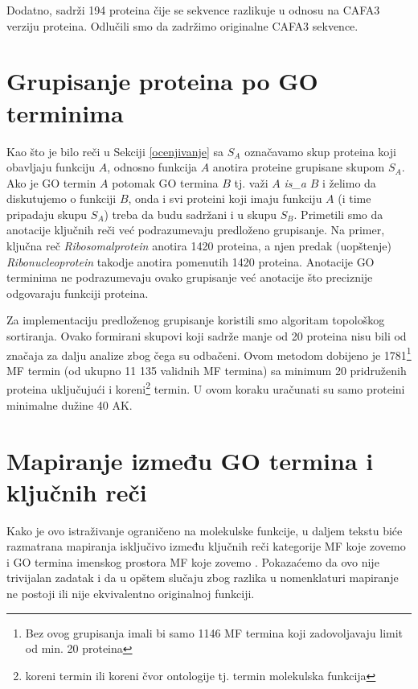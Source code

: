Dodatno, \swissprot sadrži 194 proteina čije se sekvence razlikuje u
odnosu na CAFA3 verziju proteina. Odlučili smo da zadržimo originalne CAFA3
sekvence.

\section{Grupisanje proteina po GO terminima}
\label{grupisanje}

Kao što je bilo reči u Sekciji \ref{ocenjivanje} sa $S_A$ označavamo skup
proteina koji obavljaju funkciju $A$, odnosno funkcija $A$ anotira proteine
grupisane skupom $S_A$.
Ako je GO termin $A$ potomak GO termina $B$ tj. važi $A$ \textit{is\_a} $B$ i
želimo da diskutujemo o funkciji $B$, onda i svi proteini koji imaju funkciju
$A$ (i time pripadaju skupu $S_A$) treba da budu sadržani i u skupu $S_B$.
Primetili smo da anotacije ključnih reči već podrazumevaju predloženo grupisanje.
Na primer, ključna reč \textit{Ribosomalprotein} anotira 1420 proteina, a
njen predak (uopštenje) \textit{Ribonucleoprotein} takodje anotira pomenutih 1420 proteina.
Anotacije GO terminima ne podrazumevaju ovako grupisanje već anotacije što
preciznije odgovaraju funkciji proteina. 
 
Za implementaciju predloženog grupisanje koristili smo algoritam topološkog
sortiranja. Ovako formirani skupovi koji sadrže manje od 20 proteina nisu bili
od značaja za dalju analize zbog čega su odbačeni.
Ovom metodom dobijeno je 1781\footnote{Bez ovog grupisanja imali bi samo 1146
MF termina  koji zadovoljavaju limit od min.  20 proteina} MF termin (od ukupno
11 135 validnih MF termina) sa minimum 20 pridruženih proteina uključujući i
koreni\footnote{koreni termin ili koreni čvor ontologije tj.  termin molekulska
funkcija} termin. U ovom koraku uračunati su samo proteini minimalne dužine 40
AK.

\section{Mapiranje između GO termina i \swissprot ključnih reči}
\label{kw2go_mapiranje}

Kako je ovo istraživanje ograničeno na molekulske funkcije, u daljem tekstu biće
razmatrana mapiranja isključivo između ključnih reči kategorije MF koje zovemo
 i GO termina imenskog prostora MF koje zovemo
. Pokazaćemo da ovo nije trivijalan zadatak i da u opštem
slučaju zbog razlika u nomenklaturi mapiranje ne postoji ili nije ekvivalentno
originalnoj funkciji.

